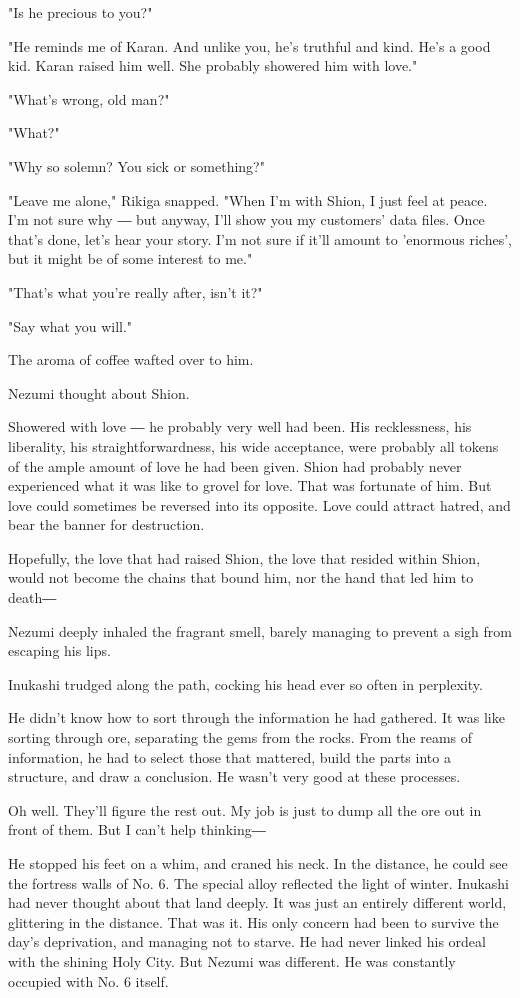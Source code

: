 "Is he precious to you?"

"He reminds me of Karan. And unlike you, he's truthful and kind. He's a
good kid. Karan raised him well. She probably showered him with love."

"What's wrong, old man?"

"What?"

"Why so solemn? You sick or something?"

"Leave me alone," Rikiga snapped. "When I'm with Shion, I just feel at
peace. I'm not sure why ― but anyway, I'll show you my customers' data
files. Once that's done, let's hear your story. I'm not sure if it'll
amount to 'enormous riches', but it might be of some interest to me."

"That's what you're really after, isn't it?"

"Say what you will."

The aroma of coffee wafted over to him.

Nezumi thought about Shion.

Showered with love ― he probably very well had been. His recklessness,
his liberality, his straightforwardness, his wide acceptance, were
probably all tokens of the ample amount of love he had been given. Shion
had probably never experienced what it was like to grovel for love. That
was fortunate of him. But love could sometimes be reversed into its
opposite. Love could attract hatred, and bear the banner for
destruction.

Hopefully, the love that had raised Shion, the love that resided within
Shion, would not become the chains that bound him, nor the hand that led
him to death―

Nezumi deeply inhaled the fragrant smell, barely managing to prevent a
sigh from escaping his lips.

Inukashi trudged along the path, cocking his head ever so often in
perplexity.

He didn't know how to sort through the information he had gathered. It
was like sorting through ore, separating the gems from the rocks. From
the reams of information, he had to select those that mattered, build
the parts into a structure, and draw a conclusion. He wasn't very good
at these processes.

Oh well. They'll figure the rest out. My job is just to dump all the ore
out in front of them. But I can't help thinking―

He stopped his feet on a whim, and craned his neck. In the distance, he
could see the fortress walls of No. 6. The special alloy reflected the
light of winter. Inukashi had never thought about that land deeply. It
was just an entirely different world, glittering in the distance. That
was it. His only concern had been to survive the day's deprivation, and
managing not to starve. He had never linked his ordeal with the shining
Holy City. But Nezumi was different. He was constantly occupied with No.
6 itself.

